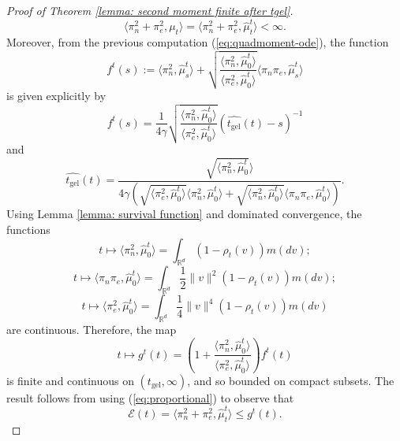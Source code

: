 \begin{proof}[Proof of Theorem \ref{lemma: second moment finite after tgel}]
\begin{equation}
   \langle \pi_n^2+ \pi_e^2, \mu_t\rangle = \langle \pi_n^2+\pi_e^2, \widehat{\mu}^t_{t}\rangle <\infty.
\end{equation} Moreover, from the previous computation (\ref{eq:quadmoment-ode}), the function \begin{equation}
    f^t(s):=\langle \pi_n^2, \widehat{\mu}^t_s\rangle +\sqrt{\frac{\langle \pi_n^2, \widehat{\mu}^t_0\rangle}{\langle \pi_e^2, \widehat{\mu}^t_0 \rangle}}\langle \pi_n\pi_e, \widehat{\mu}^t_s\rangle
\end{equation}is given explicitly by \begin{equation}
    f^t(s)=\frac{1}{4\gamma}\sqrt{\frac{\langle\pi_n^2, \widehat{\mu}^t_0\rangle }{\langle \pi_e^2, \widehat{\mu}^t_0\rangle}}\left(\widehat{t_\text{gel}}(t)-s\right)^{-1}
\end{equation} and \begin{equation}
    \widehat{t_\text{gel}}(t)=\frac{\sqrt{\langle \pi_n^2, \widehat{\mu}^t_0}\rangle}{4\gamma\left(\sqrt{\langle \pi_e^2, \widehat{\mu}^t_0 \rangle}\langle \pi_n^2, \widehat{\mu}^t_0\rangle +\sqrt{\langle \pi_n^2, \widehat{\mu}^t_0\rangle}\langle \pi_n\pi_e, \widehat{\mu}^t_0\rangle\right)}.
\end{equation} Using Lemma \ref{lemma: survival function} and dominated convergence, the functions \begin{equation}
    t\mapsto \langle \pi_n^2, \widehat{\mu}^t_0\rangle =\int_{\mathbb{R}^d} (1-\rho_t(v)) m(dv);
\end{equation} \begin{equation}
    t\mapsto \langle \pi_n \pi_e, \widehat{\mu}^t_0\rangle =\int_{\mathbb{R}^d} \frac{1}{2}\|v\|^2(1-\rho_t(v)) m(dv);
\end{equation} \begin{equation}
    t\mapsto \langle \pi_e^2, \widehat{\mu}^t_0\rangle =\int_{\mathbb{R}^d} \frac{1}{4}\|v\|^4(1-\rho_t(v)) m(dv)
\end{equation} are continuous. Therefore, the map \begin{equation}
    t\mapsto g^t(t)= \left(1+\frac{\langle \pi_n^2, \widehat{\mu}^t_0\rangle}{\langle \pi_e^2, \widehat{\mu}^t_0\rangle}\right)f^t(t)
\end{equation} is finite and continuous on $(t_\text{gel}, \infty)$, and so bounded on compact subsets. The result follows from using (\ref{eq:proportional}) to observe that \begin{equation}
    \mathcal{E}(t)=\langle \pi_n^2+\pi_e^2, \widehat{\mu}^t_t\rangle \leq g^t(t).
\end{equation} \end{proof}

